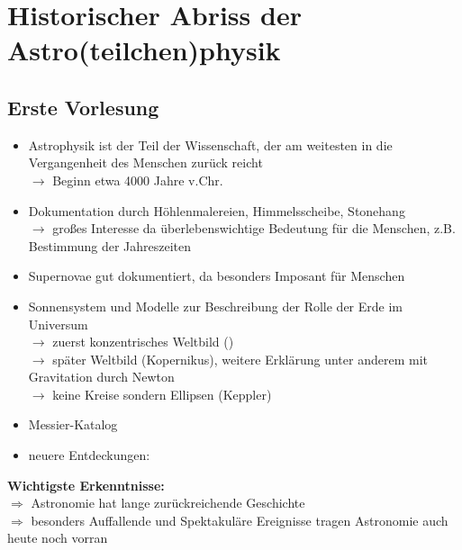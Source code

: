 \section{Historischer Abriss der Astro(teilchen)physik}

\subsection{Erste Vorlesung}
\begin{itemize}
\item Astrophysik ist der Teil der Wissenschaft, der am weitesten in die Vergangenheit des Menschen zurück reicht\\
      $\longrightarrow$ Beginn etwa 4000 Jahre v.Chr.
\item  Dokumentation durch Höhlenmalereien, Himmelsscheibe, Stonehang\\
      $\longrightarrow$ großes Interesse da überlebenswichtige Bedeutung für die Menschen, z.B. Bestimmung der Jahreszeiten
\item Supernovae gut dokumentiert, da besonders Imposant für Menschen
\item Sonnensystem und Modelle zur Beschreibung der Rolle der Erde im Universum\\
  	 $\longrightarrow$ zuerst konzentrisches Weltbild ()\\
     $\longrightarrow$ später Weltbild (Kopernikus), weitere Erklärung unter anderem mit Gravitation durch Newton\\
     $\longrightarrow$ keine Kreise sondern Ellipsen (Keppler)
\item Messier-Katalog
\item neuere Entdeckungen:

\end{itemize}

\textbf{Wichtigste Erkenntnisse:}\\
$\Longrightarrow$ Astronomie hat lange zurückreichende Geschichte\\
$\Longrightarrow$ besonders Auffallende und Spektakuläre Ereignisse tragen Astronomie auch heute noch vorran

